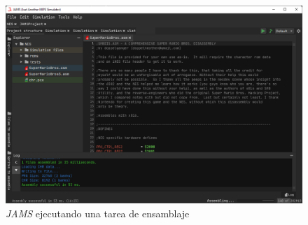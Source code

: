 \begin{figure}[h]
    \centering
    \includegraphics[width=\textwidth]{images/tecnologias/jams-assembling}
    \caption{\textit{JAMS} ejecutando una tarea de ensamblaje}
    \label{fig:jams-assembling}
\end{figure}